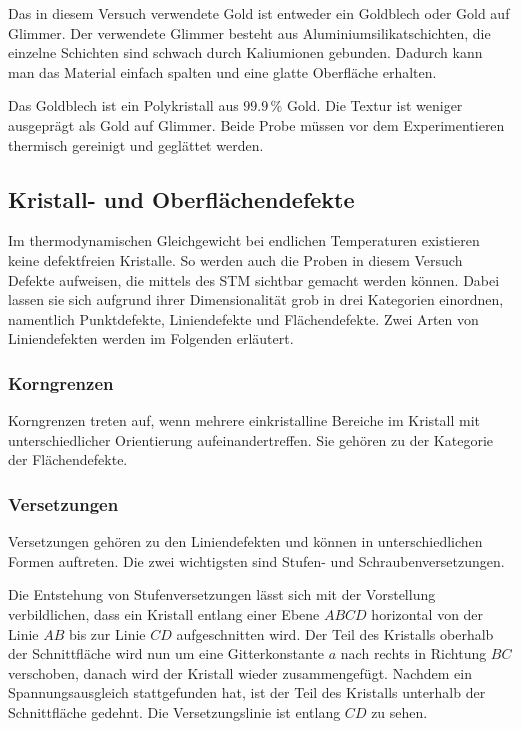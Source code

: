 \documentclass[12pt,a4paper]{scrartcl}
\numberwithin{equation}{section} %
\begin{document}
Das in diesem Versuch verwendete Gold ist entweder ein Goldblech oder Gold auf Glimmer. Der verwendete Glimmer besteht aus Aluminiumsilikatschichten, die einzelne Schichten sind schwach durch Kaliumionen gebunden. Dadurch kann man das Material einfach spalten und eine glatte Oberfläche erhalten.

Das Goldblech ist ein Polykristall aus $99.9\,\%$ Gold. Die Textur ist weniger ausgeprägt als Gold auf Glimmer. Beide Probe müssen vor dem Experimentieren thermisch gereinigt und geglättet werden.

\hypertarget{defekte}{
\subsection{Kristall- und Oberflächendefekte}\label{defekte}}
Im thermodynamischen Gleichgewicht bei endlichen Temperaturen existieren keine defektfreien Kristalle. So werden auch die Proben in diesem Versuch Defekte aufweisen, die mittels des STM sichtbar gemacht werden können. Dabei lassen sie sich aufgrund ihrer Dimensionalität grob in drei Kategorien einordnen, namentlich Punktdefekte, Liniendefekte und Flächendefekte. Zwei Arten von Liniendefekten werden im Folgenden erläutert.

\hypertarget{korngrenzen}{
\subsubsection{Korngrenzen}\label{korngrenzen}}
Korngrenzen treten auf, wenn mehrere einkristalline Bereiche im Kristall mit unterschiedlicher Orientierung aufeinandertreffen. Sie gehören zu der Kategorie der Flächendefekte. \cite{Gross} %

\hypertarget{versetzungen}{
\subsubsection{Versetzungen}\label{versetzungen}}
Versetzungen gehören zu den Liniendefekten und können in unterschiedlichen Formen auftreten. Die zwei wichtigsten sind Stufen- und Schraubenversetzungen.

Die Entstehung von Stufenversetzungen lässt sich mit der Vorstellung verbildlichen, dass  ein Kristall entlang einer Ebene $ABCD$ horizontal von der Linie $AB$ bis zur Linie $CD$ aufgeschnitten wird. Der Teil des Kristalls oberhalb der Schnittfläche wird nun um eine Gitterkonstante $a$ nach rechts in Richtung $BC$ verschoben, danach wird der Kristall wieder zusammengefügt. Nachdem ein Spannungsausgleich stattgefunden hat, ist der Teil des Kristalls unterhalb der Schnittfläche gedehnt. Die Versetzungslinie ist entlang $CD$ zu sehen.
\end{document}
